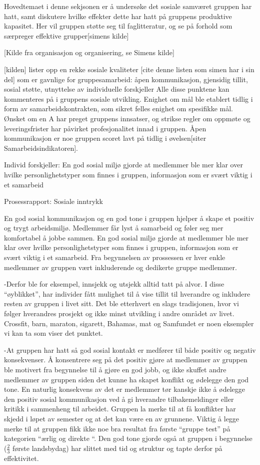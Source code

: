 
Hovedtemaet i denne sekjsonen er å undersøke det sosiale samværet gruppen har hatt, samt diskutere hvilke effekter dette har hatt på gruppens produktive kapasitet. Her vil gruppen støtte seg til faglitteratur, og se på forhold som særpreger effektive grupper[simens kilde]

[Kilde fra organisasjon og organisering, se Simens kilde]

[kilden] lister opp en rekke sosiale kvaliteter [cite denne listen som simen har i sin del] som er gavnlige for gruppesamarbeid:  åpen kommunikasjon, gjensidig tillit, sosial støtte, utnyttelse av individuelle forskjeller
Alle disse punktene kan kommenteres på i gruppens sosiale utvikling.
Enighet om mål ble etablert tidlig i form av samarbeidskontrakten, som sikret felles enighet om spesifikke mål. Ønsket om en A har preget gruppens innsatser, og strikse regler om oppmøte og leveringsfrister har påvirket profesjonalitet innad i gruppen. 
Åpen kommunikasjon er noe gruppen scoret lavt på tidlig i øvelsen[siter Samarbeidsindikatoren]. 


Individ forskjeller: En god sosial miljø gjorde at medlemmer ble mer klar over hvilke personlighetstyper som finnes i gruppen, informasjon som er svært viktig i et samarbeid



Prosessrapport: Sosiale inntrykk

En god sosial kommunikasjon og en god tone i gruppen hjelper å skape et positiv og trygt arbeidsmiljø. Medlemmer får lyst å samarbeid og føler seg mer komfortabel å jobbe sammen. En god sosial miljø gjorde at medlemmer ble mer klar over hvilke personlighetstyper som finnes i gruppen, informasjon som er svært viktig i et samarbeid. Fra begynnelsen av prossessen er hver enkle medlemmer av gruppen vært inkluderende og dedikerte gruppe medlemmer. 

-Derfor ble for eksempel, innsjekk og utsjekk alltid tatt på alvor. I disse “øyblikket”, har individer fått mulighet til å vise tillit til hverandre og inkludere resten av gruppen i livet sitt. 
Det ble etterhvert en slags tradisjonen, hvor vi følger hverandres prosjekt og ikke minst utvikling i andre området av livet. Crossfit, barn, maraton, sigarett, Bahamas, mat og Samfundet er noen eksempler vi kan ta som viser det punktet. 

-At gruppen har hatt så god sosial kontakt er medfører til både positiv og negativ konsekvenser. Å konsentrere seg på det positiv gjøre at medlemmer av gruppen ble motivert fra begynnelse til å gjøre en god jobb, og ikke skuffet andre medlemmer av gruppen siden det kunne ha skapet konflikt og ødelegge den god tone. En naturlig konsekvens av det er medlemmer tør kanskje ikke å ødelegge den positiv sosial kommunikasjon ved å gi hverandre tilbakemeldinger eller kritikk i sammenheng til arbeidet. Gruppen la merke til at få konflikter har skjedd i løpet av semester og at det kan være en av grunnene. Viktig å legge merke til at gruppen fikk ikke noe bra resultat fra første “gruppe test” på kategorien “ærlig og direkte “. Den god tone gjorde også at gruppen i begynnelse ($\frac{2}{3}$ første landsbydag)  har slittet med tid og struktur og tapte derfor på effektivitet. 

